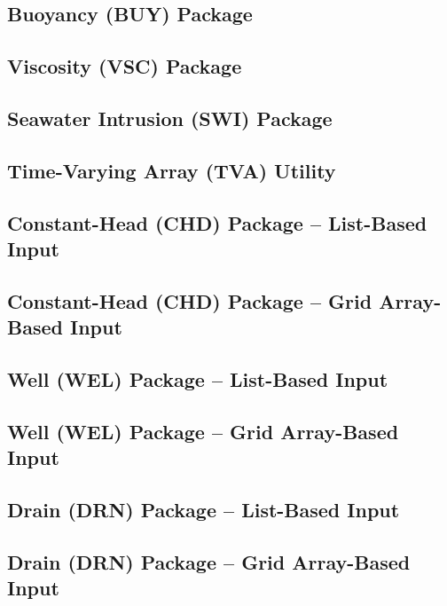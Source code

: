 \newpage
\subsection{Buoyancy (BUY) Package}


\newpage
\subsection{Viscosity (VSC) Package}


\newpage
\subsection{Seawater Intrusion (SWI) Package}


\newpage
\subsection{Time-Varying Array (TVA) Utility}


\newpage
\subsection{Constant-Head (CHD) Package -- List-Based Input}


\newpage
\subsection{Constant-Head (CHD) Package -- Grid Array-Based Input}


\newpage
\subsection{Well (WEL) Package -- List-Based Input}


\newpage
\subsection{Well (WEL) Package -- Grid Array-Based Input}


\newpage
\subsection{Drain (DRN) Package -- List-Based Input}


\newpage
\subsection{Drain (DRN) Package -- Grid Array-Based Input}



